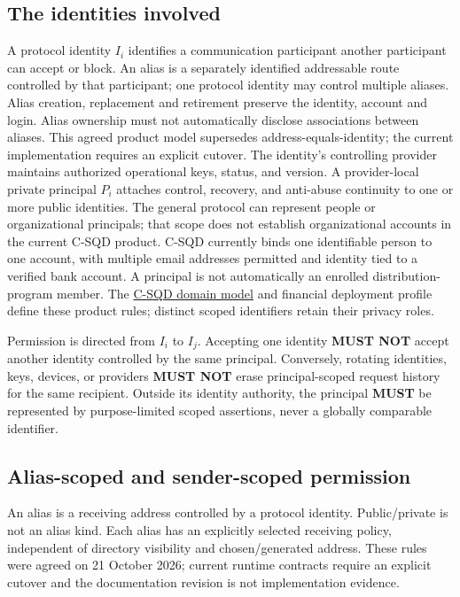 \documentclass[11pt]{article}
\newcommand{\MUST}{\textbf{MUST}}
\newcommand{\MUSTNOT}{\textbf{MUST NOT}}
\begin{document}
\subsection{The identities involved}

A protocol identity $I_i$ identifies a communication participant another
participant can accept or block. An alias is a separately identified addressable
route controlled by that participant; one protocol identity may control multiple
aliases. Alias creation, replacement and retirement preserve the identity,
account and login. Alias ownership must not automatically disclose associations
between aliases. This agreed product model supersedes address-equals-identity;
the current implementation requires an explicit cutover. The identity's controlling
provider maintains authorized operational keys, status, and version. A provider-local private principal $P_i$ attaches
control, recovery, and anti-abuse continuity to one or more public identities.
The general protocol can represent people or organizational principals; that
scope does not establish organizational accounts in the current C-SQD product.
C-SQD currently binds one identifiable person to one account, with multiple
email addresses permitted and identity tied to a verified bank account.
A principal is not automatically an enrolled distribution-program member.
The \href{DOMAIN_MODEL.md}{C-SQD domain model} and financial deployment profile
define these product rules; distinct scoped identifiers retain their privacy roles.

Permission is directed from $I_i$ to $I_j$. Accepting one identity \MUSTNOT{}
accept another identity controlled by the same principal. Conversely, rotating
identities, keys, devices, or providers \MUSTNOT{} erase principal-scoped
request history for the same recipient. Outside its identity authority, the
principal \MUST{} be represented by purpose-limited scoped assertions, never a
globally comparable identifier.

\subsection{Alias-scoped and sender-scoped permission}

An alias is a receiving address controlled by a protocol identity. Public/private
is not an alias kind. Each alias has an explicitly selected receiving policy,
independent of directory visibility and chosen/generated address. These rules
were agreed on 21 October 2026; current runtime contracts require an explicit
cutover and the documentation revision is not implementation evidence.
\end{document}
